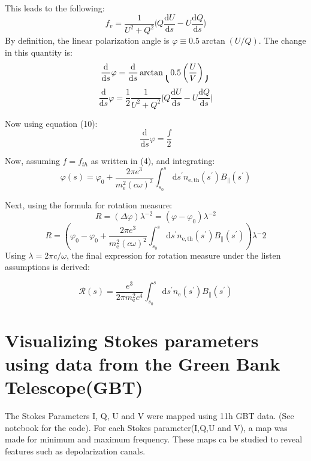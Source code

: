 \documentclass[apj]{emulateapj}
\begin{document}
This leads to the following: 
\begin{equation}
f_v=\frac{1}{U^2+Q^2}\lgroup{Q\frac{\text{d}U}{\text{d}s}}-{U\frac{\text{d}Q}{\text{d}s}}\rgroup
\end{equation}
By definition, the linear polarization angle is $\varphi \equiv 0.5 \arctan (U / Q)$. The change in this quantity is: 
$$
\frac{\text{d}}{\text{d}s}\varphi=\frac{\text{d}}{\text{d}s}\arctan\lgroup0.5\left(\frac{U}{V}\right)\rgroup
\\
$$
$$
\frac{\text{d}}{\text{d}s}\varphi=\frac{1}{2}\frac{1}{U^2+Q^2}\lgroup{Q\frac{\text{d}U}{\text{d}s}}-{U\frac{\text{d}Q}{\text{d}s}}\rgroup
$$

Now using equation (10):
$$
\frac{\text{d}}{\text{d}s}\varphi=\frac{f}{2}
$$

Now, assuming $f=f_{th}$ as written in (4), and integrating:
$$
\varphi(s)=\varphi_0+\frac{2 \pi e^3}{m_{\mathrm{e}}^2(c \omega)^2} \int_{s_0}^s \mathrm{~d} s^{\prime} n_{\mathrm{e}, \mathrm{th}}\left(s^{\prime}\right) B_{\|}\left(s^{\prime}\right)
$$

Next, using the formula for rotation measure:
$$
R=(\Delta \varphi) \lambda^{-2}=\left(\varphi-\varphi_0\right) \lambda^{-2}
$$
$$
R=(\varphi_0-\varphi_0+\frac{2 \pi e^3}{m_{\mathrm{e}}^2(c \omega)^2} \int_{s_0}^s \mathrm{~d} s^{\prime} n_{\mathrm{e}, \mathrm{th}}\left(s^{\prime}\right) B_{\|}\left(s^{\prime}\right))\lambda^-2
$$
Using $\lambda=2 \pi c / \omega$, the final expression for rotation measure under the listen assumptions is derived: 

\begin{equation}
\mathcal{R}(s)=\frac{e^3}{2 \pi m_{\mathrm{e}}^2 c^4} \int_{s_0}^s \mathrm{~d} s^{\prime} n_{\mathrm{e}}\left(s^{\prime}\right) B_{\|}\left(s^{\prime}\right)
\end{equation}




\section{Visualizing Stokes parameters using data from the Green Bank Telescope(GBT)}
The Stokes Parameters I, Q, U and V were mapped using 11h GBT data. (See  notebook for the code). For each Stokes parameter(I,Q,U and V), a map was made for minimum and maximum frequency. These maps ca be studied to reveal features such as depolarization canals.
\end{document}
